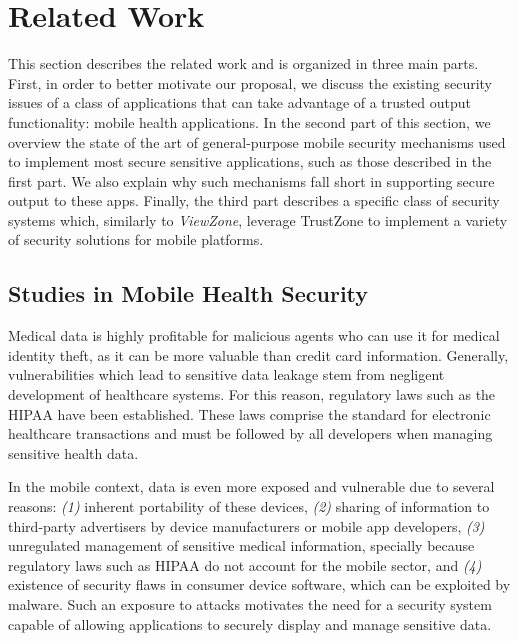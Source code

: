 
% 
% 
\section{Related Work}
\label{sec:relatedWork}

This section describes the related work and is organized in three main parts. First, in order to better motivate our proposal, we discuss the existing security issues of a class of applications that can take advantage of a trusted output functionality: mobile health applications. In the second part of this section, we overview the state of the art of general-purpose mobile security mechanisms used to implement most secure sensitive applications, such as those described in the first part. We also explain why such mechanisms fall short in supporting secure output to these apps. Finally, the third part describes a specific class of security systems which, similarly to \emph{ViewZone}, leverage TrustZone to implement a variety of security solutions for mobile platforms.

\subsection{Studies in Mobile Health Security}
\label{sec:mhealth}

Medical data is highly profitable for malicious agents who can use it for medical identity theft, as it can be more valuable than credit card information. Generally, vulnerabilities which lead to sensitive data leakage stem from negligent development of healthcare systems. For this reason, regulatory laws such as the \ac{HIPAA} have been established. These laws comprise the standard for electronic healthcare transactions and must be followed by all developers when managing sensitive health data.

In the mobile context, data is even more exposed and vulnerable due to several reasons: \emph{(1)} inherent portability of these devices, \emph{(2)} sharing of information to third-party advertisers by device manufacturers or mobile app developers, \emph{(3)} unregulated management of sensitive medical information, specially because regulatory laws such as \ac{HIPAA} do not account for the mobile sector, and \emph{(4)} existence of security flaws in consumer device software, which can be exploited by malware. Such an exposure to attacks motivates the need for a security system capable of allowing applications to securely display and manage sensitive data.

